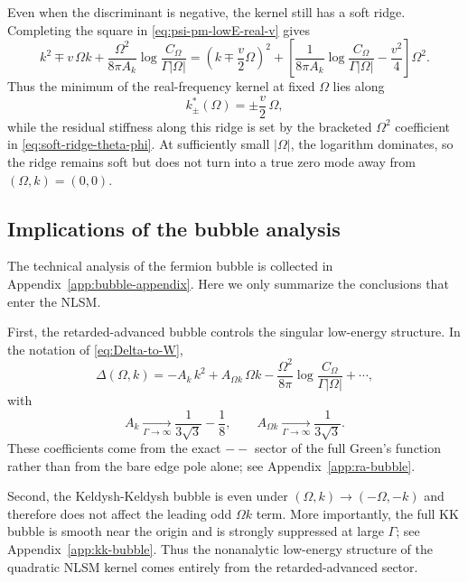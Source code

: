 \documentclass[aps,prx,preprint,amsmath,amssymb]{revtex4-2}
\begin{document}
Even when the discriminant is negative, the kernel still has a soft ridge.
Completing the square in \eqref{eq:psi-pm-lowE-real-v} gives
\begin{equation}\label{eq:soft-ridge-theta-phi}
k^2\mp v\,\Omega k
+\frac{\Omega^2}{8\pi A_k}\log\!\frac{C_\Omega}{\Gamma|\Omega|}
=
\left(k\mp\frac{v}{2}\Omega\right)^2
+\left[
\frac{1}{8\pi A_k}\log\!\frac{C_\Omega}{\Gamma|\Omega|}
-\frac{v^2}{4}
\right]\Omega^2.
\end{equation}
Thus the minimum of the real-frequency kernel at fixed \(\Omega\) lies along
\begin{equation}\label{eq:ridge-theta-phi}
k_\pm^{\ast}(\Omega)=\pm \frac{v}{2}\,\Omega,
\end{equation}
while the residual stiffness along this ridge is set by the bracketed
\(\Omega^2\) coefficient in \eqref{eq:soft-ridge-theta-phi}.  At sufficiently
small \(|\Omega|\), the logarithm dominates, so the ridge remains soft but does
not turn into a true zero mode away from \((\Omega,k)=(0,0)\).

\subsection{Implications of the bubble analysis}

The technical analysis of the fermion bubble is collected in
Appendix~\ref{app:bubble-appendix}.  Here we only summarize the conclusions that
enter the NLSM.

First, the retarded-advanced bubble controls the singular low-energy structure.
In the notation of \eqref{eq:Delta-to-W},
\begin{equation}\label{eq:Delta-summary-main}
\Delta(\Omega,k)
=
-A_k\,k^2
+A_{\Omega k}\,\Omega k
-\frac{\Omega^2}{8\pi}\log\!\frac{C_\Omega}{\Gamma|\Omega|}
+\cdots,
\end{equation}
with
\begin{equation}\label{eq:Ak-Aomegak-summary-main}
A_k\xrightarrow[\Gamma\to\infty]{}\frac{1}{3\sqrt{3}}-\frac{1}{8},
\qquad
A_{\Omega k}\xrightarrow[\Gamma\to\infty]{}\frac{1}{3\sqrt{3}}.
\end{equation}
These coefficients come from the exact \(--\) sector of the full Green's
function rather than from the bare edge pole alone; see
Appendix~\ref{app:ra-bubble}.

Second, the Keldysh-Keldysh bubble is even under
\((\Omega,k)\rightarrow(-\Omega,-k)\) and therefore does not affect the leading
odd \(\Omega k\) term.  More importantly, the full KK bubble is smooth near the
origin and is strongly suppressed at large \(\Gamma\); see
Appendix~\ref{app:kk-bubble}.  Thus the nonanalytic low-energy structure of the
quadratic NLSM kernel comes entirely from the retarded-advanced sector.
\end{document}
